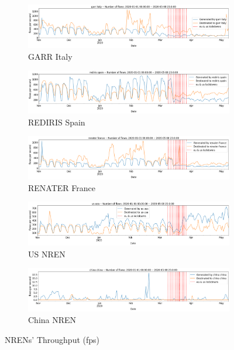 \documentclass[10pt, journal, letterpaper]{IEEEtran}
\newcommand\linearFigSze{0.48}
\begin{document}
\begin{figure}
\begin{subfigure}{\linearFigSze\textwidth}
          \centering
          \includegraphics[width=\columnwidth]{img/garr_fps.png}
          \caption{GARR Italy}
          \label{fig:garr_fps}
    \end{subfigure}
    \begin{subfigure}{\linearFigSze\textwidth}
          \centering
          \includegraphics[width=\columnwidth]{img/rediris_fps.png}
          \caption{REDIRIS Spain}
          \label{fig:rediris_fps}
    \end{subfigure}
    \begin{subfigure}{\linearFigSze\textwidth}
          \centering
          \includegraphics[width=\columnwidth]{img/renater_fps.png}
          \caption{RENATER France}
          \label{fig:renater_fps}
    \end{subfigure}
    \begin{subfigure}{\linearFigSze\textwidth}
          \centering
          \includegraphics[width=\columnwidth]{img/us_fps.png}
          \caption{US NREN}
          \label{fig:US_fps}
    \end{subfigure}
    \begin{subfigure}{\linearFigSze\textwidth}
          \centering
          \includegraphics[width=\columnwidth]{img/china_fps.png}
          \caption{China NREN}
          \label{fig:china_fps}
    \end{subfigure}
    \caption{NRENs' Throughput (fps)}
    \label{fig:nrens_fps}
\end{figure}
\end{document}
